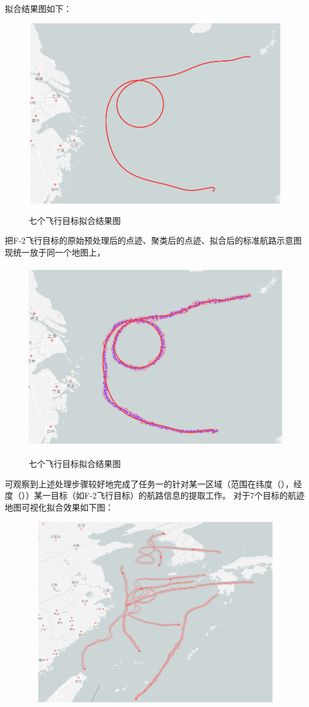 \documentclass[GBK]{ctexart}
\begin{document}
\begin{spacing}{1.5}
拟合结果图如下：
\begin{figure}[H]
  \centering
  \includegraphics[width=15cm,height=8cm]{22}\\
  \caption{七个飞行目标拟合结果图}\label{22}
\end{figure}
把F-2飞行目标的原始预处理后的点迹、聚类后的点迹、拟合后的标准航路示意图现统一放于同一个地图上，
\begin{figure}[H]
  \centering
  \includegraphics[width=15cm,height=8cm]{23}\\
  \caption{七个飞行目标拟合结果图}\label{23}
\end{figure}
可观察到上述处理步骤较好地完成了任务一的针对某一区域（范围在纬度（），经度（））某一目标（如F-2飞行目标）的航路信息的提取工作。
对于7个目标的航迹地图可视化拟合效果如下图：
\begin{figure}[H]
  \centering
  \includegraphics[width=15cm,height=8cm]{quantinihe}\\

\end{figure}
\end{spacing}
\end{document}
